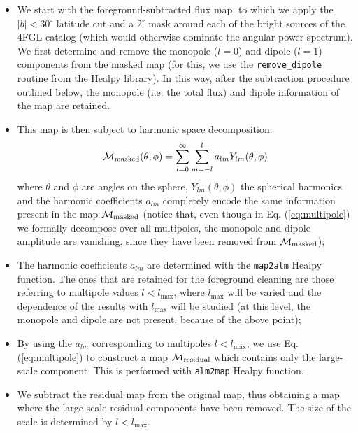 \begin{itemize}
\item We start with the foreground-subtracted flux map, to which we apply the $|b|<30^\circ$ latitude cut and a $2^\circ$ mask around each of the bright sources of the 4FGL catalog (which would otherwise dominate the angular power spectrum).
We first determine and remove the monopole ($l=0$) and dipole ($l=1$) components from the masked map (for this, we use the \verb|remove_dipole| routine from the Healpy library). In this way, after the subtraction procedure outlined below, the monopole (i.e. the total flux) and dipole information of the \fermi map are retained.

\item  This map is then subject to harmonic space decomposition:
\begin{equation}
{\cal M}_\textrm{masked}(\theta,\phi) = \sum_{l=0}^{\infty} \sum_{m=-l}^{l} a_{lm} Y_{lm}(\theta,\phi)
\label{eq:multipole}
\end{equation}
where $\theta$ and $\phi$ are angles on the sphere, $Y_{lm}(\theta,\phi)$ the spherical harmonics and the harmonic coefficients $a_{lm}$ completely encode the same information present in the map ${\cal M}_\textrm{masked}$  (notice that, even though in Eq. (\ref{eq:multipole}) we formally decompose over all multipoles, the monopole and dipole amplitude are vanishing, since they have been removed from  ${\cal M}_\textrm{masked}$);

\item The harmonic coefficients $a_{lm}$ are determined with the \verb|map2alm| Healpy function. The ones that are retained for the foreground cleaning are those referring to multipole values $l < l_\textrm{max}$, where $l_\textrm{max}$ will be varied and the dependence of the results with $l_\textrm{max}$ will be studied (at this level, the monopole and dipole are not present, because of the above point);

\item By using the $a_{lm}$ corresponding to multipoles $l < l_\textrm{max}$, we use Eq. (\ref{eq:multipole}) to construct a map ${\cal M}_\textrm{residual}$ which contains only the large-scale component. This is performed with \verb|alm2map| Healpy function.

\item We subtract the residual map from the original map, thus obtaining a map where the large scale residual components have been removed. The size of the scale is determined by $l < l_\textrm{max}$.

\end{itemize}

